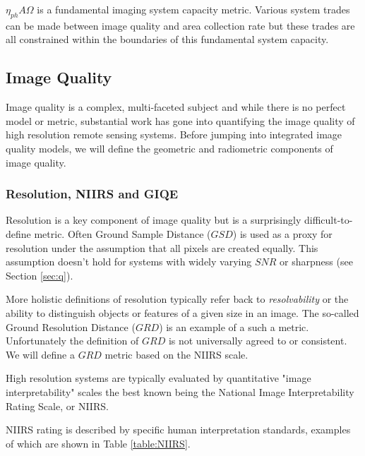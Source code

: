 \documentclass[10pt,journal]{IEEEtran}  %
\begin{document}
$\eta_{ph} A \Omega$ is a fundamental imaging system capacity metric.  Various system trades can be made between image quality and area collection rate but these trades are all constrained within the boundaries of this fundamental system capacity.


\subsection{Image Quality}
\label{sec:iq}

Image quality is a complex, multi-faceted subject and while there is no perfect model or metric, substantial work has gone into quantifying the image quality of high resolution remote sensing systems.  Before jumping into integrated image quality models, we will define the geometric and radiometric components of image quality.

\subsubsection{Resolution, NIIRS and GIQE}
Resolution is a key component of image quality but is a surprisingly difficult-to-define metric.  Often Ground Sample Distance ($GSD$) is used as a proxy for resolution under the assumption that all pixels are created equally.  This assumption doesn't hold for systems with widely varying $SNR$ or sharpness (see Section \ref{sec:q}).

More holistic definitions of resolution typically refer back to \emph{resolvability} or the ability to distinguish objects or features of a given size in an image.  The so-called Ground Resolution Distance ($GRD$) is an example of a such a metric.  Unfortunately the definition of $GRD$ is not universally agreed to or consistent.  We will define a $GRD$ metric based on the NIIRS scale.

High resolution systems are typically evaluated by quantitative "image interpretability" scales the best known being the National Image Interpretability Rating Scale, or NIIRS.

NIIRS rating is described by specific human interpretation standards, examples of which are shown in Table \ref{table:NIIRS}\cite{niirs}.
\end{document}
